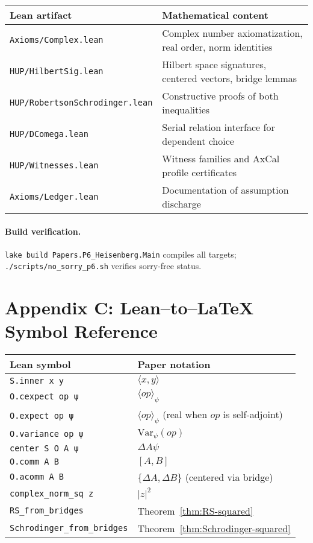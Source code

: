 \documentclass[11pt]{article}
\newcommand{\ip}[2]{\langle #1, #2 \rangle}
\newcommand{\E}[1]{\langle #1 \rangle}
\newcommand{\comm}[2]{[#1, #2]}
\newcommand{\acomm}[2]{\{#1, #2\}} %
\newcommand{\absC}[1]{\left| #1 \right|}
\newcommand{\Var}{\mathrm{Var}}
\theoremstyle{plain}
\theoremstyle{definition}
\theoremstyle{remark}
\begin{document}
\begin{center}
\begin{tabular}{ll}
\toprule
\textbf{Lean artifact} & \textbf{Mathematical content} \\
\midrule
\verb|Axioms/Complex.lean| & Complex number axiomatization, real order, norm identities \\
\verb|HUP/HilbertSig.lean| & Hilbert space signatures, centered vectors, bridge lemmas \\
\verb|HUP/RobertsonSchrodinger.lean| & Constructive proofs of both inequalities \\
\verb|HUP/DComega.lean| & Serial relation interface for dependent choice \\
\verb|HUP/Witnesses.lean| & Witness families and AxCal profile certificates \\
\verb|Axioms/Ledger.lean| & Documentation of assumption discharge \\
\bottomrule
\end{tabular}
\end{center}

\paragraph{Build verification.}
\texttt{lake build Papers.P6\_Heisenberg.Main} compiles all targets; \texttt{./scripts/no\_sorry\_p6.sh} verifies sorry-free status.

\section*{Appendix C: Lean--to--LaTeX Symbol Reference}

\begin{center}
\begin{tabular}{ll}
\toprule
\textbf{Lean symbol} & \textbf{Paper notation} \\
\midrule
\verb|S.inner x y| & $\ip{x}{y}$ \\
\verb|O.cexpect op ψ| & $\E{op}_\psi$ \\
\verb|O.expect op ψ| & $\E{op}_\psi$ (real when $op$ is self-adjoint) \\
\verb|O.variance op ψ| & $\Var_\psi(op)$ \\
\verb|center S O A ψ| & $\Delta A\psi$ \\
\verb|O.comm A B| & $\comm{A}{B}$ \\
\verb|O.acomm A B| & $\acomm{\Delta A}{\Delta B}$ (centered via bridge) \\
\verb|complex_norm_sq z| & $\absC{z}^2$ \\
\verb|RS_from_bridges| & Theorem~\ref{thm:RS-squared} \\
\verb|Schrodinger_from_bridges| & Theorem~\ref{thm:Schrodinger-squared} \\
\bottomrule
\end{tabular}
\end{center}
\end{document}
